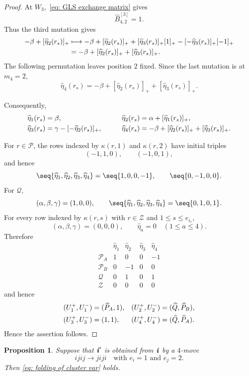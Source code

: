 \documentclass[12pt, leqno]{amsart}
\numberwithin{equation}{section}
\theoremstyle{plain}
\newtheorem{proposition}[lemma]{Proposition}
\theoremstyle{definition}
\renewcommand{\le}{\leqslant}
\newcommand{\ii}{ \textbf{\textit{i}}}
\newcommand{\hB}{\widehat{B}}
\newcommand{\hP}{\widehat{P}}
\newcommand{\hQ}{\widehat{Q}}
\newcommand{\heta}{\widehat{\eta}}
\newcommand{\calP}{\mathcal{P}}
\newcommand{\calQ}{\mathcal{Q}}
\newcommand{\calZ}{\mathcal{Z}}
\begin{document}
\begin{proof}
At $W_3$,~\eqref{eq: GLS exchange matrix} gives
\[
\hB^{[3]}_{4,2}=1.
\]
Thus the third mutation gives
\begin{align*}
-\beta+[\heta_2(r_s)]_+ &\longmapsto -\beta+[\heta_2(r_s)]_+ +[\heta_3(r_s)]_+[1]_+ -[-\heta_3(r_s)]_+[-1]_+\allowdisplaybreaks\\
&= -\beta+[\heta_2(r_s)]_++[\heta_3(r_s)]_+.
\end{align*}
The following permutation leaves position $2$ fixed. Since the last
mutation is at $m_4=2$,
\[
\heta_4(r_s) = -\beta+[\heta_2(r_s)]_++[\heta_3(r_s)]_+.
\]

Consequently,
\begin{align*}
\heta_1(r_s)&=\beta,
&\qquad
\heta_2(r_s)&=\alpha+[\heta_1(r_s)]_+, \allowdisplaybreaks\\
\heta_3(r_s)&=\gamma-[-\heta_2(r_s)]_+,
&
\heta_4(r_s)&=-\beta+[\heta_2(r_s)]_++[\heta_3(r_s)]_+.
\end{align*}

 For $r\in\calP$, the rows indexed by $\kappa(r,1)$ and $\kappa(r,2)$ have initial triples \[
(-1,1,0), \qquad (-1,0,1),
\]
and hence
\[
\seq{\heta_1,\heta_2,\heta_3,\heta_4} = \seq{1,0,0,-1}, \qquad \seq{0,-1,0,0}.
\]
For $\calQ$,
\[
(\alpha,\beta,\gamma)=(1,0,0), \qquad \seq{\heta_1,\heta_2,\heta_3,\heta_4} = \seq{0,1,0,1}.
\]
 For every row indexed by $\kappa(r,s)$ with $r\in\calZ$ and $1\le s\le e_{i_r}$,
\[
(\alpha,\beta,\gamma)=(0,0,0), \qquad  \heta_a=0 \quad(1\le a\le4).
\]
Therefore
\[
\begin{array}{c|cccc}
 &\heta_1&\heta_2&\heta_3&\heta_4\\ \hline
\calP_A&1&0&0&-1\\
\calP_B&0&-1&0&0\\
\calQ&0&1&0&1\\
\calZ&0&0&0&0
\end{array}
\]
and hence
\begin{align*}
(U_1^+,U_1^-)&=(\hP_A,1),&
(U_2^+,U_2^-)&=(\hQ,\hP_B),\allowdisplaybreaks\\
(U_3^+,U_3^-)&=(1,1),&
(U_4^+,U_4^-)&=(\hQ,\hP_A).
\end{align*}
Hence the assertion follows.
\end{proof}

\begin{proposition}\label{prop: cluster folding four move 12}
Suppose that $\ii'$ is obtained from $\ii$ by a $4$-move
\[
ijij\longrightarrow jiji \quad\text{with $e_i=1$ and $e_j=2$.}
\]
Then \eqref{eq: folding of cluster var} holds.
\end{proposition}
\end{document}
